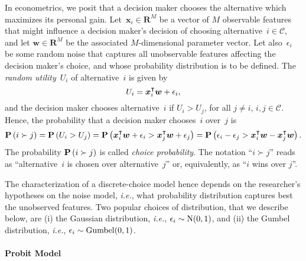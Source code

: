 In econometrics, we posit that a decision maker chooses the alternative which maximizes its personal gain.
Let~$\bm{x}_i \in \mathbf{R}^M$ be a vector of $M$ observable features that might influence a decision maker's decision of choosing alternative~$i \in \mathcal{C}$, and let $\bm{w}\in \mathbf{R}^M$ be the associated $M$-dimensional parameter vector.
Let also~$\epsilon_i$ be some random noise that captures all unobservable features affecting the decision maker's choice, and whose probability distribution is to be defined.
The \emph{random utility}~$U_i$ of alternative~$i$ is given by
\begin{equation}
  U_i = \bm{x}_i^\intercal \bm{w} + \epsilon_i,
\end{equation}
and the decision maker chooses alternative~$i$ if $U_i > U_j$, for all $j \neq i$, $i,j \in \mathcal{C}$.
Hence, the probability that a decision maker chooses~$i$ over~$j$ is
\begin{equation}
  \mathbf{P}\left( i \succ j \right) = \mathbf{P}\left( U_i > U_j \right) = \mathbf{P}\left(  \bm{x}_i^\intercal \bm{w} + \epsilon_i > \bm{x}_j^\intercal \bm{w} + \epsilon_j \right) = \mathbf{P}\left( \epsilon_i - \epsilon_j > \bm{x}_i^\intercal \bm{w} - \bm{x}_j^\intercal \bm{w} \right).
\end{equation}
The probability $\mathbf{P}\left( i \succ j \right)$ is called \emph{choice probability}.
The notation ``$i \succ j$'' reads as ``alternative~$i$ is chosen over alternative~$j$'' or, equivalently, as ``$i$ wins over $j$''.

The characterization of a discrete-choice model hence depends on the researcher's hypotheses on the noise model, \textit{i.e.}, what probability distribution captures best the unobserved features.
Two popular choices of distribution, that we describe below, are (i) the Gaussian distribution, \textit{i.e.}, $\epsilon_i \sim \mathrm{N}( 0, 1 )$, and (ii) the Gumbel distribution, \textit{i.e.}, $\epsilon_i \sim \mathrm{Gumbel}( 0, 1 )$.

\paragraph{Probit Model}

